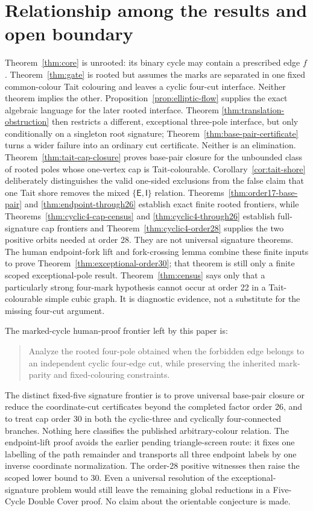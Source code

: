 \documentclass[11pt]{article}
\theoremstyle{definition}
\theoremstyle{remark}
\begin{document}
\section{Relationship among the results and open boundary}

Theorem~\ref{thm:core} is unrooted: its binary cycle may contain a
prescribed edge \(f\).  Theorem~\ref{thm:gate} is rooted but assumes the
marks are separated in one fixed common-colour Tait colouring and leaves
a cyclic four-cut interface.  Neither theorem implies the other.
Proposition~\ref{prop:elliptic-flow} supplies the exact algebraic
language for the later rooted interface.  Theorem
\ref{thm:translation-obstruction} then restricts a different,
exceptional three-pole interface, but only conditionally on a singleton
root signature; Theorem~\ref{thm:base-pair-certificate} turns a wider
failure into an ordinary cut certificate.  Neither is an elimination.
Theorem~\ref{thm:tait-cap-closure} proves base-pair closure for the
unbounded class of rooted poles whose one-vertex cap is Tait-colourable.
Corollary~\ref{cor:tait-shore} deliberately distinguishes the valid
one-sided exclusions from the false claim that one Tait shore removes
the mixed \(\{\mathsf E,\mathsf I\}\) relation.
Theorems~\ref{thm:order17-base-pair} and
\ref{thm:endpoint-through26} establish exact finite rooted frontiers,
while Theorems~\ref{thm:cyclic4-cap-census} and
\ref{thm:cyclic4-through26} establish full-signature cap frontiers and
Theorem~\ref{thm:cyclic4-order28} supplies the two positive orbits
needed at order 28.  They are not universal signature theorems.  The
human endpoint-fork lift and fork-crossing lemma combine these finite
inputs to prove Theorem~\ref{thm:exceptional-order30}; that theorem is
still only a finite scoped exceptional-pole result.
Theorem~\ref{thm:census} says only that a particularly strong
four-mark hypothesis cannot occur at order 22 in a Tait-colourable
simple cubic graph.  It is diagnostic evidence, not a substitute for
the missing four-cut argument.

The marked-cycle human-proof frontier left by this paper is:
\begin{quote}
Analyze the rooted four-pole obtained when the forbidden edge belongs
to an independent cyclic four-edge cut, while preserving the inherited
mark-parity and fixed-colouring constraints.
\end{quote}
The distinct fixed-five signature frontier is to prove universal
base-pair closure or reduce the coordinate-cut certificates beyond the
completed factor order 26, and to treat cap order 30 in both the
cyclic-three and cyclically four-connected branches.  Nothing here
classifies the published arbitrary-colour relation.
The endpoint-lift proof avoids the earlier pending triangle-screen
route: it fixes one labelling of the path remainder and transports all
three endpoint labels by one inverse coordinate normalization.  The
order-28 positive witnesses then raise the scoped lower bound to 30.
Even a universal resolution of the exceptional-signature problem
would still leave the remaining global reductions in a Five-Cycle
Double Cover proof.  No claim about the orientable conjecture is made.
\end{document}
